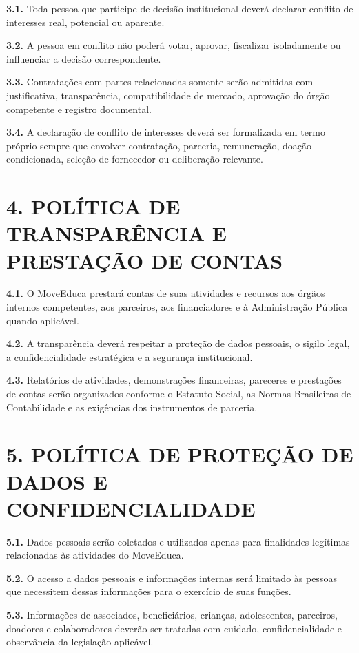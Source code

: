 \documentclass[11pt,a4paper]{article}
\begin{document}
\textbf{3.1.} Toda pessoa que participe de decisão institucional deverá declarar conflito de interesses real, potencial ou aparente.

\textbf{3.2.} A pessoa em conflito não poderá votar, aprovar, fiscalizar isoladamente ou influenciar a decisão correspondente.

\textbf{3.3.} Contratações com partes relacionadas somente serão admitidas com justificativa, transparência, compatibilidade de mercado, aprovação do órgão competente e registro documental.

\textbf{3.4.} A declaração de conflito de interesses deverá ser formalizada em termo próprio sempre que envolver contratação, parceria, remuneração, doação condicionada, seleção de fornecedor ou deliberação relevante.

\section*{4. POLÍTICA DE TRANSPARÊNCIA E PRESTAÇÃO DE CONTAS}

\textbf{4.1.} O MoveEduca prestará contas de suas atividades e recursos aos órgãos internos competentes, aos parceiros, aos financiadores e à Administração Pública quando aplicável.

\textbf{4.2.} A transparência deverá respeitar a proteção de dados pessoais, o sigilo legal, a confidencialidade estratégica e a segurança institucional.

\textbf{4.3.} Relatórios de atividades, demonstrações financeiras, pareceres e prestações de contas serão organizados conforme o Estatuto Social, as Normas Brasileiras de Contabilidade e as exigências dos instrumentos de parceria.

\section*{5. POLÍTICA DE PROTEÇÃO DE DADOS E CONFIDENCIALIDADE}

\textbf{5.1.} Dados pessoais serão coletados e utilizados apenas para finalidades legítimas relacionadas às atividades do MoveEduca.

\textbf{5.2.} O acesso a dados pessoais e informações internas será limitado às pessoas que necessitem dessas informações para o exercício de suas funções.

\textbf{5.3.} Informações de associados, beneficiários, crianças, adolescentes, parceiros, doadores e colaboradores deverão ser tratadas com cuidado, confidencialidade e observância da legislação aplicável.
\end{document}
